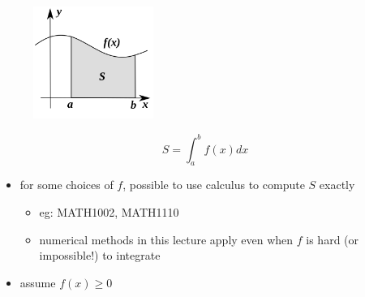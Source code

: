 \documentclass[english,14pt]{beamer}
\begin{document}

\begin{frame}[fragile]

\frametitle{}

\vspace*{-4mm}
\begin{figure}[ht]
	\centering
	\includegraphics[width=0.35\textwidth]{figures/integralArea}
\end{figure}
\vspace*{-3mm}
\[
\boxed{S = \int_a^b f(x) dx}
\]
\vspace*{-3mm}
\begin{itemize}
	\item for some choices of $f$, possible to use calculus to compute $S$ exactly
	\begin{itemize}
		\item eg: MATH1002, MATH1110
		\item numerical methods in this lecture apply even when $f$ is hard (or impossible!) to integrate
	\end{itemize}
	\item assume $f(x) \geq 0$
\end{itemize}

\end{frame}

\end{document}
